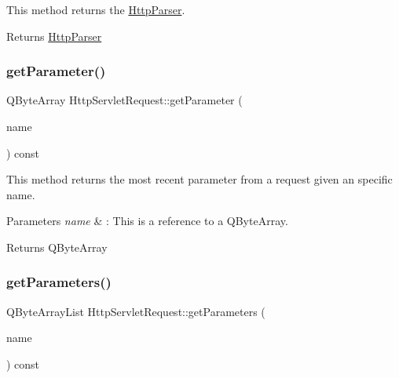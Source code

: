 This method returns the \mbox{\hyperlink{class_http_parser}{Http\+Parser}}. 

\begin{DoxyReturn}{Returns}
\mbox{\hyperlink{class_http_parser}{Http\+Parser}} 
\end{DoxyReturn}
\mbox{\label{class_http_servlet_request_a707c561d255615792ebe3bc9b8e3896c}} 
\subsubsection{\texorpdfstring{get\+Parameter()}{getParameter()}}
{\footnotesize\ttfamily Q\+Byte\+Array Http\+Servlet\+Request\+::get\+Parameter (\begin{DoxyParamCaption}\item[{const Q\+Byte\+Array \&}]{name }\end{DoxyParamCaption}) const}



This method returns the most recent parameter from a request given an specific name. 


\begin{DoxyParams}{Parameters}
{\em name} & \+: This is a reference to a Q\+Byte\+Array. \\
\hline
\end{DoxyParams}
\begin{DoxyReturn}{Returns}
Q\+Byte\+Array 
\end{DoxyReturn}
\mbox{\label{class_http_servlet_request_ab361a363bdd6d627aecba897dd12809b}} 
\subsubsection{\texorpdfstring{get\+Parameters()}{getParameters()}}
{\footnotesize\ttfamily Q\+Byte\+Array\+List Http\+Servlet\+Request\+::get\+Parameters (\begin{DoxyParamCaption}\item[{const Q\+Byte\+Array \&}]{name }\end{DoxyParamCaption}) const}



